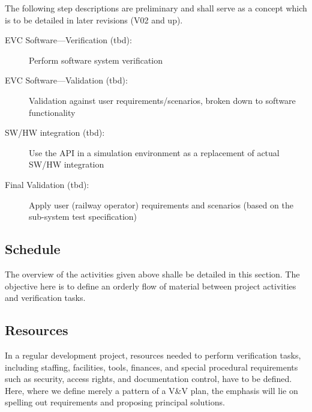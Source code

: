 The following step descriptions are preliminary and shall serve as a
concept which is to be detailed in later revisions (V02 and up).
%
\begin{description}
\item[EVC Software---Verification (tbd):] Perform software system verification
\item[EVC Software---Validation (tbd):] Validation against user
  requirements/scenarios, broken down to software functionality
\item[SW/HW integration (tbd):] Use the API in a simulation
  environment as a replacement of actual SW/HW integration
\item[Final Validation (tbd):] Apply user (railway operator) requirements and scenarios (based
  on the sub-system test specification)
\end{description}

\subsection{Schedule}
The overview of the activities given above shalle be detailed in this
section. The objective here is to define an orderly flow of material
between project activities and verification tasks.  


\subsection{\VV Resources}
\label{sec:vv-resources}

In a regular development project, resources needed to perform
verification tasks, including staffing, facilities, tools, finances,
and special procedural requirements such as security, access rights,
and documentation control, have to be defined. Here, where we define
merely a pattern of a V\&V plan, the emphasis will lie on spelling out
requirements and proposing
principal solutions.


